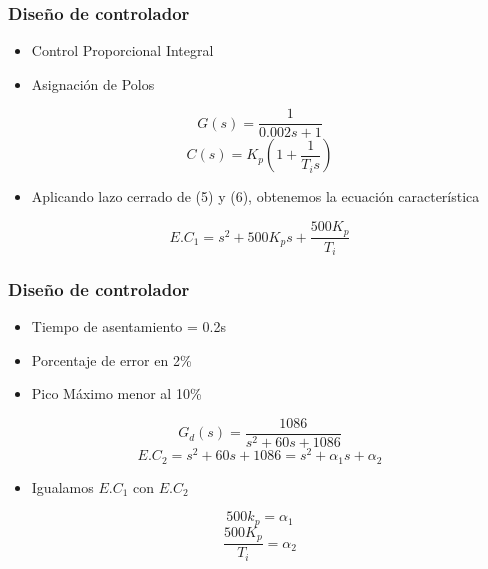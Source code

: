 \documentclass[11pt]{beamer}
\begin{document}
  \begin{frame}
    \frametitle{Diseño de controlador}
    \begin{itemize}
      \item Control Proporcional Integral
      \item Asignación de Polos
    \end{itemize}
    \begin{equation}
      G(s) = \frac{1}{0.002s + 1}
    \end{equation}
    \begin{equation}
      C(s) = K_p(1 + \frac{1}{T_is})
    \end{equation}
    \begin{itemize}
      \item Aplicando lazo cerrado de (5) y (6), obtenemos la ecuación característica
    \end{itemize}
    \begin{equation}
      E.C_1 = s^2 + 500K_ps + \frac{500K_p}{T_i}
    \end{equation}
  \end{frame}
  \begin{frame}
    \frametitle{Diseño de controlador}
    \begin{itemize}
      \item Tiempo de asentamiento = 0.2s
      \item Porcentaje de error en 2\%
      \item Pico Máximo menor al 10\%
    \end{itemize}
    \begin{equation}
      G_d(s) = \frac{1086}{s^2+60s+1086}
    \end{equation}
    \begin{equation}
      E.C_2 = s^2 +60s + 1086 = s^2 + \alpha_1s + \alpha_2
    \end{equation}
    \begin{itemize}
      \item Igualamos $E.C_1$ con $E.C_2$ 
    \end{itemize}
    \begin{equation}
      500k_p = \alpha_1
    \end{equation}
    \begin{equation}
      \frac{500K_p}{T_i} = \alpha_2
    \end{equation}
  \end{frame}
\end{document}
